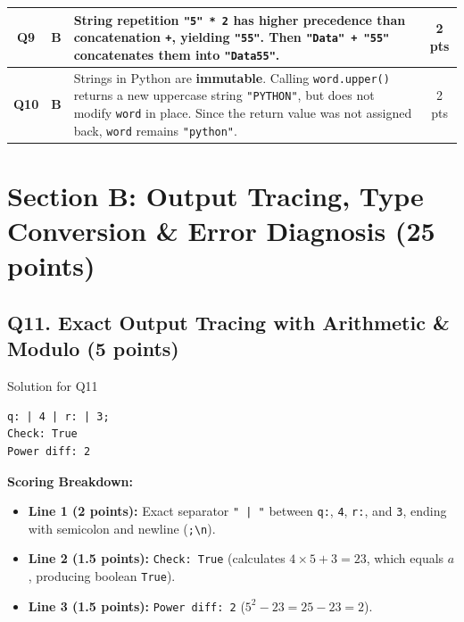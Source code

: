 \documentclass[11pt,a4paper]{article}
\begin{document}
\begin{center}
\begin{tabularx}{\textwidth}{|c|c|X|c|}
\hline
\textbf{Q9} & \textbf{B} & String repetition \texttt{"5" * 2} has higher precedence than concatenation \texttt{+}, yielding \texttt{"55"}. Then \texttt{"Data" + "55"} concatenates them into \texttt{"Data55"}. & 2 pts \\
\hline
\textbf{Q10} & \textbf{B} & Strings in Python are \textbf{immutable}. Calling \texttt{word.upper()} returns a new uppercase string \texttt{"PYTHON"}, but does not modify \texttt{word} in place. Since the return value was not assigned back, \texttt{word} remains \texttt{"python"}. & 2 pts \\
\hline
\end{tabularx}
\end{center}

\vspace{0.2cm}

\section*{Section B: Output Tracing, Type Conversion \& Error Diagnosis (25 points)}

\subsection*{Q11. Exact Output Tracing with Arithmetic \& Modulo (5 points)}
\begin{solbox}{Solution for Q11}
\begin{lstlisting}
q: | 4 | r: | 3;
Check: True
Power diff: 2
\end{lstlisting}
\textbf{Scoring Breakdown:}
\begin{itemize}[leftmargin=2em]
  \item \textbf{Line 1 (2 points):} Exact separator \texttt{" | "} between \texttt{q:}, \texttt{4}, \texttt{r:}, and \texttt{3}, ending with semicolon and newline (\texttt{;\textbackslash n}).
  \item \textbf{Line 2 (1.5 points):} \texttt{Check: True} (calculates $4 \times 5 + 3 = 23$, which equals $a$, producing boolean \texttt{True}).
  \item \textbf{Line 3 (1.5 points):} \texttt{Power diff: 2} ($5^{2} - 23 = 25 - 23 = 2$).
\end{itemize}
\end{solbox}
\end{document}
